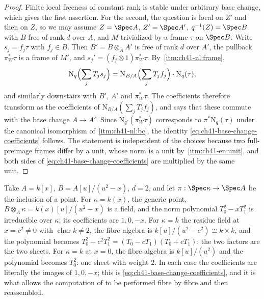\begin{proof}
Finite local freeness of constant rank is stable under arbitrary base
change, which gives the first assertion.  For the second, the question is
local on $Z'$ and then on $Z$, so we may assume $Z=\Spec A$,
$Z'=\Spec A'$, $q^{-1}(Z)=\Spec B$ with $B$ free of rank $d$ over
$A$, and $M$ trivialized by a frame $\tau$ on $\Spec B$.  Write
$s_j=f_j\tau$ with $f_j\in B$.  Then
$B'=B\otimes_AA'$ is free of rank $d$ over $A'$, the pullback
$\pi_W^*\tau$ is a frame of $M'$, and $s_j'=(f_j\otimes1)\pi_W^*\tau$.
By \,\cref{itm:ch41-nl:frame},
\[
 \mathrm N_q\Bigl(\sum_jT_js_j\Bigr)
 =\mathrm N_{B/A}\Bigl(\sum_jT_jf_j\Bigr)\cdot\mathrm N_q(\tau),
\]
and similarly downstairs with $B'$, $A'$ and $\pi_W^*\tau$.  The
coefficients therefore transform as the coefficients of
$\mathrm N_{B/A}(\sum_jT_jf_j)$, and
 says that these commute with the base
change $A\to A'$.  Since $\mathrm N_{q'}(\pi_W^*\tau)$ corresponds to
$\pi^*\mathrm N_q(\tau)$ under the canonical isomorphism of
\,\cref{itm:ch41-nl:bc}, the identity
\eqref{eq:ch41-base-change-coefficients} follows.  The statement is
independent of the choices because two full-preimage frames differ by a unit, whose norm
is a unit by \,\cref{itm:ch41-en:unit}, and both
sides of \eqref{eq:ch41-base-change-coefficients} are multiplied by the same
unit.
\end{proof}

\begin{example}
\label{ex:ch41-base-change-fibre}
Take $A=k[x]$, $B=A[u]/(u^2-x)$, $d=2$, and let
$\pi:\Spec\kappa\to\Spec A$ be the inclusion of a point.  For
$\kappa=k(x)$, the generic point, $B\otimes_A\kappa=k(x)[u]/(u^2-x)$ is
a field, and the norm polynomial $T_0^2-xT_1^2$ is irreducible over
$\kappa$; its coefficients are $1,0,-x$.  For $\kappa=k$ the residue
field at $x=c^2\ne0$ with $\operatorname{char}k\ne2$, the fibre algebra
is $k[u]/(u^2-c^2)\cong k\times k$, and the polynomial becomes
$T_0^2-c^2T_1^2=(T_0-cT_1)(T_0+cT_1)$: the two factors are the two
sheets.  For $\kappa=k$ at $x=0$, the fibre algebra is $k[u]/(u^2)$
and the polynomial becomes $T_0^2$: one sheet with weight $2$.  In each
case the coefficients are literally the images of $1,0,-x$; this is
\eqref{eq:ch41-base-change-coefficients}, and it is what allows the
computation of  to be performed fibre by fibre and
then reassembled.
\end{example}

